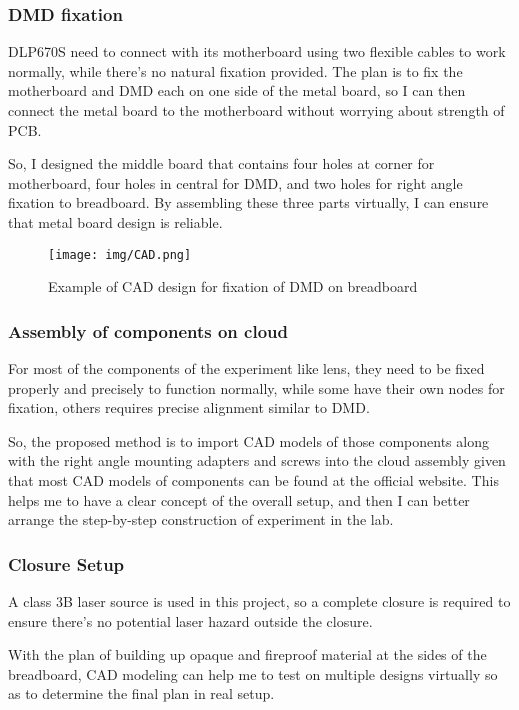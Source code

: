 \documentclass[10pt,journal,compsoc]{IEEEtran}
\begin{document}
\subsubsection{DMD fixation}
DLP670S need to connect with its motherboard using two flexible cables to work normally, while there's no natural fixation provided. The plan is to fix the motherboard and DMD each on one side of the metal board, so I can then connect the metal board to the motherboard without worrying about strength of PCB.

So, I designed the middle board that contains four holes at corner for motherboard, four holes in central for DMD, and two holes for right angle fixation to breadboard. By assembling these three parts virtually, I can ensure that metal board design is reliable.

\begin{figure}[!h]
    \centering
    \texttt{[image: img/CAD.png]}
    \caption{Example of CAD design for fixation of DMD on breadboard}
    \label{fig:fig9}
\end{figure}

\subsubsection{Assembly of components on cloud}

For most of the components of the experiment like lens, they need to be fixed properly and precisely to function normally, while some have their own nodes for fixation, others requires precise alignment similar to DMD. 

So, the proposed method is to import CAD models of those components along with the right angle mounting adapters and screws into the cloud assembly given that most CAD models of components can be found at the official website. This helps me to have a clear concept of the overall setup, and then I can better arrange the step-by-step construction of experiment in the lab.

\subsubsection{Closure Setup}
A class 3B laser source is used in this project, so a complete closure is required to ensure there's no potential laser hazard outside the closure.

With the plan of building up opaque and fireproof material at the sides of the breadboard, CAD modeling can help me to test on multiple designs virtually so as to determine the final plan in real setup.
\end{document}
